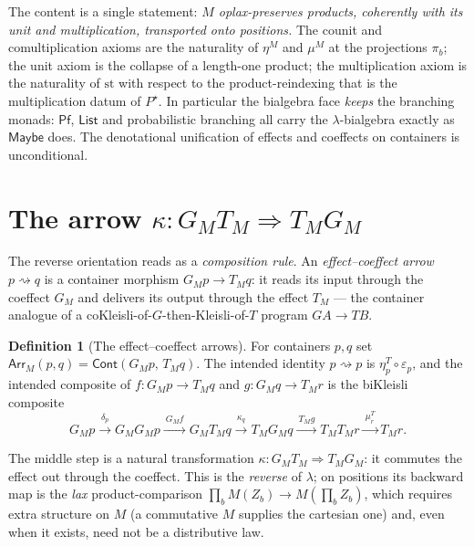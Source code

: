 \documentclass[11pt]{article}
\theoremstyle{plain}
\theoremstyle{definition}
\newtheorem{definition}[theorem]{Definition}
\theoremstyle{remark}
\newcommand{\Cont}{\mathsf{Cont}}
\newcommand{\str}{\mathrm{st}}
\newcommand{\Maybe}{\mathsf{Maybe}}
\newcommand{\Pf}{\mathsf{Pf}}
\newcommand{\List}{\mathsf{List}}
\newcommand{\Arr}{\mathsf{Arr}}
\begin{document}
The content is a single statement: \emph{$M$ oplax-preserves products, coherently with
its unit and multiplication, transported onto positions.} The counit and
comultiplication axioms are the naturality of $\eta^M$ and $\mu^M$ at the projections
$\pi_b$; the unit axiom is the collapse of a length-one product; the multiplication
axiom is the naturality of $\str$ with respect to the product-reindexing that is the
multiplication datum of $P^\star$. In particular the bialgebra face \emph{keeps} the
branching monads: $\Pf$, $\List$ and probabilistic branching all carry the
$\lambda$-bialgebra exactly as $\Maybe$ does. The denotational unification of effects
and coeffects on containers is unconditional.

\section{The arrow $\kappa\colon G_M T_M\Rightarrow T_M G_M$}\label{sec:arrow}

The reverse orientation reads as a \emph{composition rule}. An \emph{effect--coeffect
arrow} $p\rightsquigarrow q$ is a container morphism $G_M p\to T_M q$: it reads its
input through the coeffect $G_M$ and delivers its output through the effect $T_M$ --- the
container analogue of a coKleisli-of-$G$-then-Kleisli-of-$T$ program $GA\to TB$.

\begin{definition}[The effect--coeffect arrows]\label{def:arr}
For containers $p,q$ set $\Arr_M(p,q)=\Cont(G_M p,\,T_M q)$. The intended identity
$p\rightsquigarrow p$ is $\eta^T_p\circ\varepsilon_p$, and the intended composite of
$f\colon G_M p\to T_M q$ and $g\colon G_M q\to T_M r$ is the biKleisli composite
\[
  G_M p\xrightarrow{\ \delta_p\ }G_M G_M p\xrightarrow{\ G_M f\ }G_M T_M q
  \xrightarrow{\ \kappa_q\ }T_M G_M q\xrightarrow{\ T_M g\ }T_M T_M r
  \xrightarrow{\ \mu^T_r\ }T_M r.
\]
\end{definition}

The middle step is a natural transformation $\kappa\colon G_M T_M\Rightarrow T_M G_M$:
it commutes the effect out through the coeffect. This is the \emph{reverse} of
$\lambda$; on positions its backward map is the \emph{lax} product-comparison
$\prod_b M(Z_b)\to M(\prod_b Z_b)$, which requires extra structure on $M$ (a commutative
$M$ supplies the cartesian one) and, even when it exists, need not be a distributive law.
\end{document}
